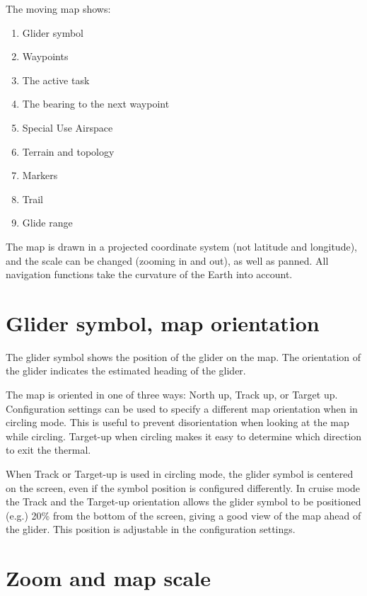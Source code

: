 \documentclass[a4paper,12pt]{refrep}
\begin{document}
The moving map shows:
\begin{enumerate} 
\item Glider symbol
\item Waypoints
\item The active task
\item The bearing to the next waypoint
\item Special Use Airspace
\item Terrain and topology
\item Markers
\item Trail
\item Glide range
\end{enumerate}
The map is drawn in a projected coordinate system (not latitude and
longitude), and the scale can be changed (zooming in and out), as well
as panned.  All navigation functions take the curvature of the Earth
into account.

\section{Glider symbol, map orientation}
The glider symbol shows the position of the glider on the map.  The
orientation of the glider indicates the estimated heading of the
glider.

The map is oriented in one of three ways: North up,
Track up, or Target up.  Configuration settings  can be used
to specify a different map orientation when in circling mode. This is useful to prevent
disorientation when looking at the map while circling.  Target-up when
circling makes it easy to determine which direction to exit the
thermal.

When Track or Target-up is used in circling mode, the glider symbol is
centered on the screen, even if the symbol position is configured differently.
In cruise mode the Track and the Target-up orientation allows the glider
symbol to be positioned (e.g.) 20\% from the bottom of the screen, giving a good view of the
map ahead of the glider.  This position is adjustable in the configuration
 settings.

\section{Zoom and map scale}
\end{document}
